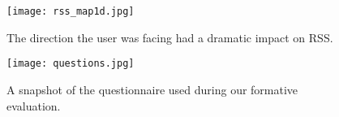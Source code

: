 \documentclass[prodmode,acmtomm]{acmsmall}
\begin{document}
\begin{figure}[h!]
\begin{center}
\texttt{[image: rss\_map1d.jpg]}
\caption{The direction the user was facing had a dramatic impact on RSS.}
\end{center}
\end{figure}

\begin{figure}[h!]
\begin{center}
\texttt{[image: questions.jpg]}
\caption{A snapshot of the questionnaire used during our formative evaluation.}
\end{center}
\end{figure}





\end{document}
